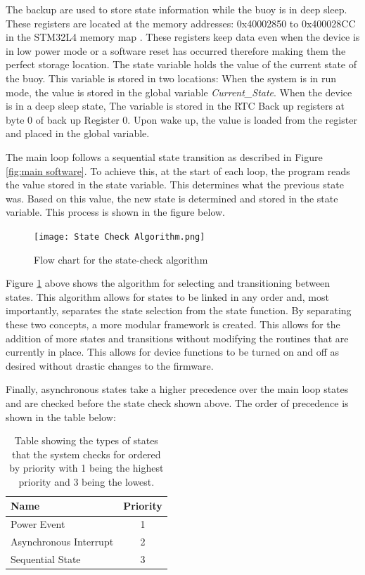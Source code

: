 The backup are used to store state information while the buoy is in deep sleep. These  registers are located at the memory addresses: 0x40002850 to 0x400028CC in the STM32L4 memory map \cite{stm32l4ref}. These registers keep data even when the device is in low power mode or a software reset has occurred therefore making them the perfect storage location. The state variable holds the value of the current state of the buoy. This variable is stored in two locations: When the system is in run mode, the value is stored in the global variable \textit{Current\_State}. When the device is in a deep sleep state, The variable is stored in the RTC Back up registers at byte 0 of back up Register 0. Upon wake up, the value is loaded from the register and placed in the global variable.

The main loop follows a sequential state transition as described in Figure \ref{fig:main software}. To achieve this, at the start of each loop, the program reads the value stored in the state variable. This determines what the previous state was. Based on this value, the new state is determined and stored in the state variable. This process is shown in the figure below.

\begin{figure}[H]
	\centering
	\texttt{[image: State Check Algorithm.png]}
	\caption{Flow chart for the state-check algorithm}
	\label{fig:state_check}
\end{figure}

Figure \ref{fig:state_check} above shows the algorithm for selecting and transitioning between states. This algorithm allows for states to be linked in any order and, most importantly, separates the state selection from the state function. By separating these two concepts, a more modular framework is created. This allows for the addition of more states and transitions without modifying the routines that are currently in place. This allows for device functions to be turned on and off as desired without drastic changes to the firmware.

Finally, asynchronous states take a higher precedence over the main loop states and are checked before the state check shown above. The order of precedence is shown in the table below:
\begin{table}[H]
	\centering
	\caption{Table showing the types of states that the system checks for ordered by priority with 1 being the highest priority and 3 being the lowest.}
	\begin{tabular}{lc}
		\hline
		Name & Priority \\
		\hline
		\hline
		Power Event & 1 \\
		\hline
		Asynchronous Interrupt & 2 \\
		\hline
		Sequential State & 3 \\
		\hline
		\hline
	\end{tabular}
	
	\label{tab:state_prio}
\end{table}

